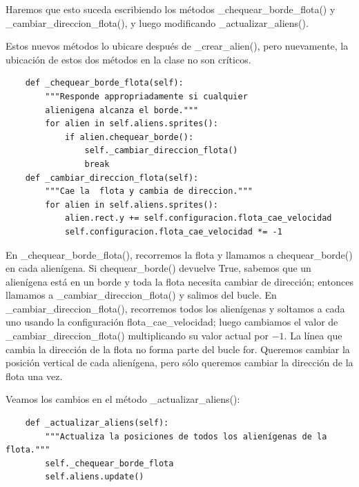 Haremos que esto suceda escribiendo los métodos {\ttfamily \_chequear\_borde\_flota()}
y {\ttfamily \_cambiar\_direccion\_flota()}, y luego modificando {\ttfamily \_actualizar\_aliens()}.

Estos nuevos métodos lo ubicare  después de {\ttfamily \_crear\_alien()}, pero nuevamente, la ubicación de estos
dos métodos en la clase no son críticos.


\hspace{-2.4cm}{\ttfamily \scriptsize invasión}

\vspace{-0.2cm}
\hspace{-2.1cm}{\ttfamily \scriptsize \_alien.py}\vspace{-0.84cm}
\begin{lstlisting}
    def _chequear_borde_flota(self):
        """Responde appropriadamente si cualquier
        alienigena alcanza el borde."""
        for alien in self.aliens.sprites():
            if alien.chequear_borde():
                self._cambiar_direccion_flota()
                break
    def _cambiar_direccion_flota(self):
        """Cae la  flota y cambia de direccion."""
        for alien in self.aliens.sprites():
            alien.rect.y += self.configuracion.flota_cae_velocidad
            self.configuracion.flota_cae_velocidad *= -1
\end{lstlisting}

En {\ttfamily  \_chequear\_borde\_flota()}, recorremos la flota y llamamos a {\ttfamily chequear\_borde()} en cada alienígena.
Si {\ttfamily chequear\_borde()} devuelve  {\ttfamily True},  sabemos que un alienígena está en un borde y toda la flota necesita cambiar de dirección; entonces llamamos a {\ttfamily \_cambiar\_direccion\_flota()} y salimos del bucle.
En {\ttfamily \_cambiar\_direccion\_flota()}, recorremos todos los alienígenas y soltamos a cada uno usando la configuración {\ttfamily flota\_cae\_velocidad}; luego cambiamos el valor de {\ttfamily \_cambiar\_direccion\_flota()} multiplicando su valor actual por  $-1$. 
La línea que cambia la dirección de la flota no forma parte del bucle {\ttfamily for}. 
Queremos cambiar la posición vertical de cada  alienígena, pero sólo queremos cambiar la dirección de la flota una vez.

Veamos los cambios en el método {\ttfamily \_actualizar\_aliens()}:

\hspace{-2.4cm}{\ttfamily \scriptsize invasión}

\vspace{-0.2cm}
\hspace{-2.1cm}{\ttfamily \scriptsize \_alien.py}\vspace{-0.84cm}
\begin{lstlisting}
    def _actualizar_aliens(self):
        """Actualiza la posiciones de todos los alienígenas de la flota."""
        self._chequear_borde_flota
        self.aliens.update()
\end{lstlisting}


